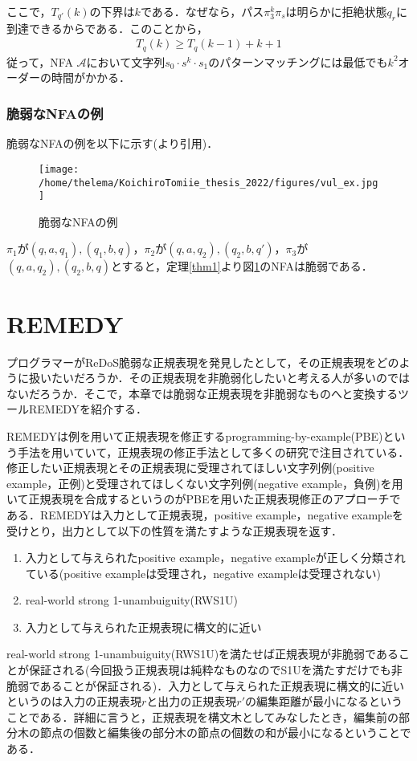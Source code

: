 \documentclass[a4paper, 12pt, dvipdfmx, uplatex]{jsreport}
\begin{document}
ここで，$T_{q'}(k)$の下界は$k$である．なぜなら，パス$\pi_3^k \pi_s$は明らかに拒絶状態$q_r$に到達できるからである．このことから，
\begin{align*}
  T_q(k)\geq T_q(k-1)+k+1
\end{align*}
従って，NFA $\mathcal{A}$において文字列$s_0\cdot s^k\cdot s_1$のパターンマッチングには最低でも$k^2$オーダーの時間がかかる．

\subsubsection{脆弱なNFAの例}\label{ex}
脆弱なNFAの例を以下に示す(\cite{vul_detect}より引用)．
\begin{figure}[H] %
  \centering
  \texttt{[image: /home/thelema/KoichiroTomiie\_thesis\_2022/figures/vul\_ex.jpg]}
  \caption{脆弱なNFAの例\label{vul_ex}}
\end{figure}

$\pi_1$が$(q,a,q_1),(q_1,b,q)$，$\pi_2$が$(q,a,q_2),(q_2,b,q')$，$\pi_3$が$(q,a,q_2),(q_2,b,q)$とすると，定理\ref{thm1}より図\ref{vul_ex}のNFAは脆弱である．




\section{REMEDY}\label{sec_remedy}
プログラマーがReDoS脆弱な正規表現を発見したとして，その正規表現をどのように扱いたいだろうか．その正規表現を非脆弱化したいと考える人が多いのではないだろうか．そこで，本章では脆弱な正規表現を非脆弱なものへと変換するツールREMEDY\cite{remedy}を紹介する．

REMEDYは例を用いて正規表現を修正するprogramming-by-example(PBE)という手法を用いていて，正規表現の修正手法として多くの研究で注目されている．修正したい正規表現とその正規表現に受理されてほしい文字列例(positive example，正例)と受理されてほしくない文字列例(negative example，負例)を用いて正規表現を合成するというのがPBEを用いた正規表現修正のアプローチである．REMEDYは入力として正規表現，positive example，negative exampleを受けとり，出力として以下の性質を満たすような正規表現を返す．
\begin{enumerate}
  \item 入力として与えられたpositive example，negative exampleが正しく分類されている(positive exampleは受理され，negative exampleは受理されない)
  \item real-world strong 1-unambuiguity(RWS1U)
  \item 入力として与えられた正規表現に構文的に近い
\end{enumerate}
real-world strong 1-unambuiguity(RWS1U)を満たせば正規表現が非脆弱であることが保証される(今回扱う正規表現は純粋なものなのでS1Uを満たすだけでも非脆弱であることが保証される)．入力として与えられた正規表現に構文的に近いというのは入力の正規表現$r$と出力の正規表現$r'$の編集距離が最小になるということである．詳細に言うと，正規表現を構文木としてみなしたとき，編集前の部分木の節点の個数と編集後の部分木の節点の個数の和が最小になるということである．



% 
% 
\end{document}
